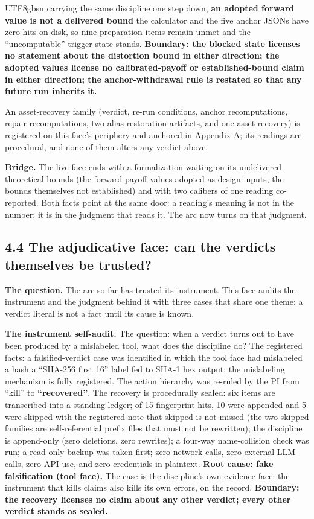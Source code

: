 \documentclass[11pt,letterpaper]{article}
\begin{document}
\begin{CJK}{UTF8}{gbsn}
carrying the same discipline one step down, \textbf{an adopted forward value is not a delivered bound} \textemdash{} the calculator and the five anchor JSONs have zero hits on disk, so nine preparation items remain unmet and the ``uncomputable'' trigger state stands. \textbf{Boundary: the blocked state licenses no statement about the distortion bound in either direction; the adopted values license no calibrated-payoff or established-bound claim in either direction; the anchor-withdrawal rule is restated so that any future run inherits it.}

An asset-recovery family (verdict, re-run conditions, anchor recomputations, repair recomputations, two alias-restoration artifacts, and one asset recovery) is registered on this face's periphery and anchored in Appendix A; its readings are procedural, and none of them alters any verdict above.

\textbf{Bridge.} The live face ends with a formalization waiting on its undelivered theoretical bounds (the forward payoff values adopted as design inputs, the bounds themselves not established) \textemdash{} and with two calibers of one reading co-reported. Both facts point at the same door: a reading's meaning is not in the number; it is in the judgment that reads it. The arc now turns on that judgment.

\subsection*{4.4 The adjudicative face: can the verdicts themselves be trusted?}

\textbf{The question.} The arc so far has trusted its instrument. This face audits the instrument and the judgment behind it \textemdash{} with three cases that share one theme: a verdict literal is not a fact until its cause is known.

\textbf{The instrument self-audit.} The question: when a verdict turns out to have been produced by a mislabeled tool, what does the discipline do? The registered facts: a falsified-verdict case was identified in which the tool face had mislabeled a hash \textemdash{} a ``SHA-256 first 16'' label fed to SHA-1 hex output; the mislabeling mechanism is fully registered. The action hierarchy was re-ruled by the PI from ``kill'' to \textbf{``recovered''}. The recovery is procedurally sealed: six items are transcribed into a standing ledger; of 15 fingerprint hits, 10 were appended and 5 were skipped \textemdash{} with the registered note that skipped is not missed (the two skipped families are self-referential prefix files that must not be rewritten); the discipline is append-only (zero deletions, zero rewrites); a four-way name-collision check was run; a read-only backup was taken first; zero network calls, zero external LLM calls, zero API use, and zero credentials in plaintext. \textbf{Root cause: fake falsification (tool face).} The case is the discipline's own evidence face: the instrument that kills claims also kills its own errors, on the record. \textbf{Boundary: the recovery licenses no claim about any other verdict; every other verdict stands as sealed.}


\end{CJK}
\end{document}
